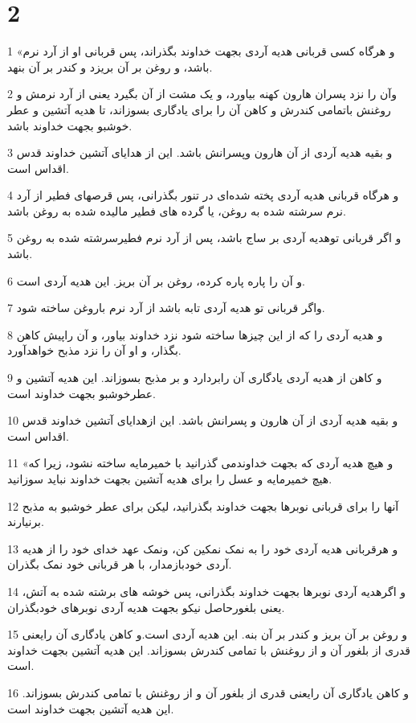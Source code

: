 \chapter{2}

\par 1 «و هرگاه کسی قربانی هدیه آردی بجهت خداوند بگذراند، پس قربانی او از آرد نرم باشد، و روغن بر آن بریزد و کندر بر آن بنهد.
\par 2 وآن را نزد پسران هارون کهنه بیاورد، و یک مشت از آن بگیرد یعنی از آرد نرمش و روغنش باتمامی کندرش و کاهن آن را برای یادگاری بسوزاند، تا هدیه آتشین و عطر خوشبو بجهت خداوند باشد.
\par 3 و بقیه هدیه آردی از آن هارون وپسرانش باشد. این از هدایای آتشین خداوند قدس اقداس است.
\par 4 و هرگاه قربانی هدیه آردی پخته شده‌ای در تنور بگذرانی، پس قرصهای فطیر از آرد نرم سرشته شده به روغن، یا گرده های فطیر مالیده شده به روغن باشد.
\par 5 و اگر قربانی توهدیه آردی بر ساج باشد، پس از آرد نرم فطیرسرشته شده به روغن باشد.
\par 6 و آن را پاره پاره کرده، روغن بر آن بریز. این هدیه آردی است.
\par 7 واگر قربانی تو هدیه آردی تابه باشد از آرد نرم باروغن ساخته شود.
\par 8 و هدیه آردی را که از این چیزها ساخته شود نزد خداوند بیاور، و آن راپیش کاهن بگذار، و او آن را نزد مذبح خواهدآورد.
\par 9 و کاهن از هدیه آردی یادگاری آن رابردارد و بر مذبح بسوزاند. این هدیه آتشین و عطرخوشبو بجهت خداوند است.
\par 10 و بقیه هدیه آردی از آن هارون و پسرانش باشد. این ازهدایای آتشین خداوند قدس اقداس است.
\par 11 «و هیچ هدیه آردی که بجهت خداوندمی گذرانید با خمیرمایه ساخته نشود، زیرا که هیچ خمیرمایه و عسل را برای هدیه آتشین بجهت خداوند نباید سوزانید.
\par 12 آنها را برای قربانی نوبرها بجهت خداوند بگذرانید، لیکن برای عطر خوشبو به مذبح برنیارند.
\par 13 و هرقربانی هدیه آردی خود را به نمک نمکین کن، ونمک عهد خدای خود را از هدیه آردی خودبازمدار، با هر قربانی خود نمک بگذران.
\par 14 و اگرهدیه آردی نوبرها بجهت خداوند بگذرانی، پس خوشه های برشته شده به آتش، یعنی بلغورحاصل نیکو بجهت هدیه آردی نوبرهای خودبگذران.
\par 15 و روغن بر آن بریز و کندر بر آن بنه. این هدیه آردی است.و کاهن یادگاری آن رایعنی قدری از بلغور آن و از روغنش با تمامی کندرش بسوزاند. این هدیه آتشین بجهت خداوند است.
\par 16 و کاهن یادگاری آن رایعنی قدری از بلغور آن و از روغنش با تمامی کندرش بسوزاند. این هدیه آتشین بجهت خداوند است.
 

